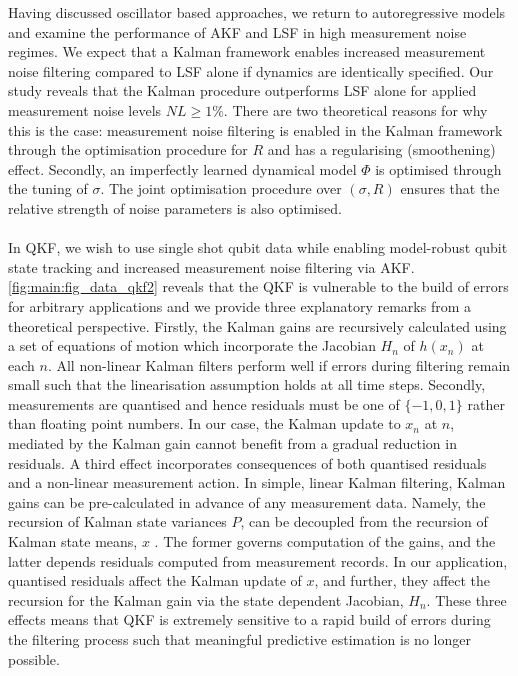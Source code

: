 Having discussed oscillator based approaches, we return to autoregressive models and examine the performance of AKF and LSF in high measurement noise regimes. We expect that a Kalman framework enables increased measurement noise filtering compared to LSF alone if dynamics are identically specified.  Our study reveals that the Kalman procedure outperforms LSF alone for applied measurement noise levels $NL \geq 1\%$. There are two theoretical reasons for why this is the case: measurement noise filtering is enabled in the Kalman framework through the optimisation procedure for $R$ and has a regularising (smoothening) effect. Secondly, an imperfectly learned dynamical model $\Phi$ is optimised through the tuning of $\sigma$. The joint optimisation procedure over $(\sigma, R)$ ensures that the relative strength of noise parameters is also optimised.
\\
\\
In QKF, we wish to use single shot qubit data while enabling model-robust qubit state tracking and increased measurement noise filtering via AKF. \cref{fig:main:fig_data_qkf2} reveals that the QKF is vulnerable to the build of errors for arbitrary applications and we provide three explanatory remarks from a theoretical perspective. Firstly, the Kalman gains are recursively calculated using a set of  equations of motion which incorporate the Jacobian $H_n$ of $h(x_n)$ at each $n$. All non-linear Kalman filters perform well if errors during filtering remain small such that the linearisation assumption holds at all time steps. Secondly, measurements are quantised and hence residuals must be one of $\{-1, 0, 1 \}$ rather than floating point numbers.  In our case, the Kalman update to $x_n$ at $n$, mediated by the Kalman gain cannot benefit from a gradual reduction in residuals. A third effect incorporates consequences of both quantised residuals and a non-linear measurement action. In simple, linear Kalman filtering, Kalman gains can be pre-calculated in advance of any measurement data. Namely, the recursion of Kalman state variances $P$, can be decoupled from the recursion of Kalman state means, $x$ \cite{grewal2001theory}. The former governs computation of the gains, and the latter depends residuals computed from measurement records. In our application, quantised residuals affect the Kalman update of $x$, and further, they affect the recursion for the Kalman gain via the state dependent Jacobian, $H_n$. These three effects means that QKF is extremely sensitive to a rapid build of errors during the filtering process such that meaningful predictive estimation is no longer possible.
